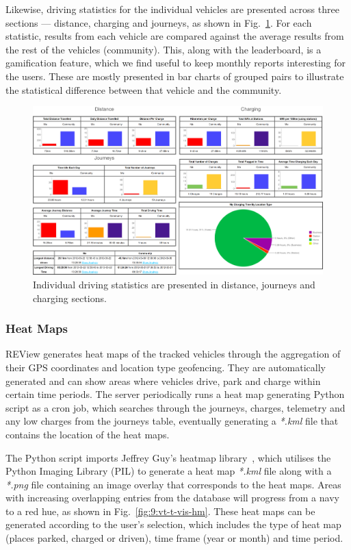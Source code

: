 Likewise, driving statistics for the individual vehicles are presented across three sections --- distance, charging and journeys, as shown in Fig.~\ref{fig:9:vt-t-vis-ds2}. For each statistic, results from each vehicle are compared against the average results from the rest of the vehicles (community). This, along with the leaderboard, is a gamification feature, which we find useful to keep monthly reports interesting for the users. These are mostly presented in bar charts of grouped pairs to illustrate the statistical difference between that vehicle and the community.

\begin{figure}[H]
	\centering
	\includegraphics[width=\linewidth]{vt-t-vis-ds2}
	\caption[Individual driving statistics]{Individual driving statistics are presented in distance, journeys and charging sections.}
	\label{fig:9:vt-t-vis-ds2}
\end{figure}

\subsubsection{Heat Maps}
REView generates heat maps of the tracked vehicles through the aggregation of their GPS coordinates and location type geofencing. They are automatically generated and can show areas where vehicles drive, park and charge within certain time periods. The server periodically runs a heat map generating Python script as a cron job, which searches through the journeys, charges, telemetry and any low charges from the journeys table, eventually generating a \textit{*.kml} file that contains the location of the heat maps.

The Python script imports Jeffrey Guy’s heatmap library~\cite{guy_python_2019}, which utilises the Python Imaging Library (PIL) to generate a heat map \textit{*.kml} file along with a \textit{*.png} file containing an image overlay that corresponds to the heat maps. Areas with increasing overlapping entries from the database will progress from a navy to a red hue, as shown in Fig.~\ref{fig:9:vt-t-vis-hm}. These heat maps can be generated according to the user’s selection, which includes the type of heat map (places parked, charged or driven), time frame (year or month) and time period.

